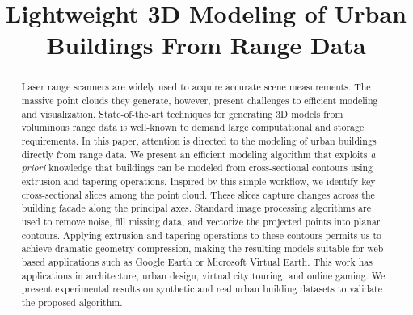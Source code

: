\documentclass[10pt, conference, compsocconf]{IEEEtran}
\begin{document}
%
\title{\Large\bf Lightweight 3D Modeling of Urban Buildings From Range Data}

\author{
\and
{}
\and
{}
}


\maketitle

\begin{abstract}
Laser range scanners are widely used to acquire accurate scene measurements.
The massive point clouds they generate, however, present challenges to
efficient modeling and visualization.
State-of-the-art techniques for generating 3D models from voluminous
range data is well-known to demand large computational and storage requirements.
In this paper, attention is directed to the modeling of urban buildings
directly from range data.
We present an efficient modeling algorithm that exploits \emph{a priori}
knowledge that buildings can be modeled from cross-sectional contours
using extrusion and tapering operations.
Inspired by this simple workflow, we identify key cross-sectional slices among
the point cloud.
These slices capture changes across the building facade along the principal axes.
Standard image processing algorithms are used to remove noise, fill missing
data, and vectorize the projected points into planar contours.
Applying extrusion and tapering operations to these contours
permits us to achieve dramatic geometry compression, making the resulting
models suitable for web-based applications such as Google Earth
or Microsoft Virtual Earth.
This work has applications in architecture, urban design, virtual city
touring, and online gaming.
We present experimental results on synthetic and real urban building
datasets to validate the proposed algorithm.
\end{abstract}
\end{document}
